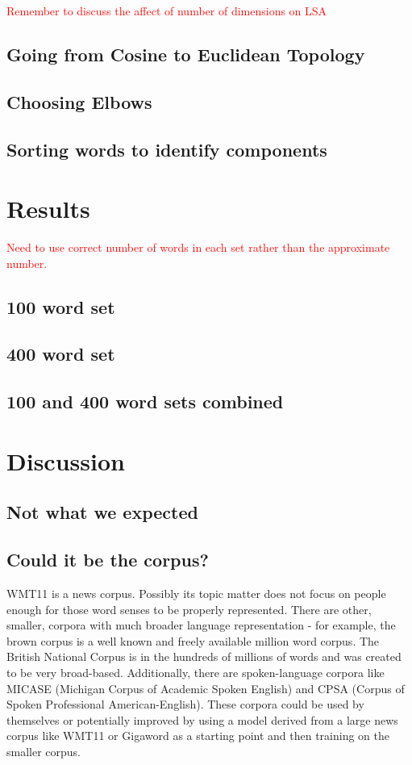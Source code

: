 \documentclass[10pt,letterpaper]{book}
\newcommand{\todo}[1]{\textcolor{red}{#1}}
\begin{document}
\todo{Remember to discuss the affect of number of dimensions on LSA}

\section{Going from Cosine to Euclidean Topology}

\section{Choosing Elbows}

\section{Sorting words to identify components}

\chapter{Results}

\todo{Need to use correct number of words in each set rather than the approximate number.}

\section{100 word set}

\section{400 word set}

\section{100 and 400 word sets combined}

\chapter{Discussion}

\section{Not what we expected}

\section{Could it be the corpus?}

WMT11 is a news corpus. Possibly its topic matter does not focus on people enough for those word senses to be properly represented. There are other, smaller, corpora with much broader language representation - for example, the brown corpus is a well known and freely available million word corpus. The British National Corpus is in the hundreds of millions of words and was created to be very broad-based. Additionally, there are spoken-language corpora like MICASE (Michigan Corpus of Academic Spoken English) and CPSA (Corpus of Spoken Professional American-English). These corpora could be used by themselves or potentially improved by using a model derived from a large news corpus like WMT11 or Gigaword as a starting point and then training on the smaller corpus.
\end{document}
